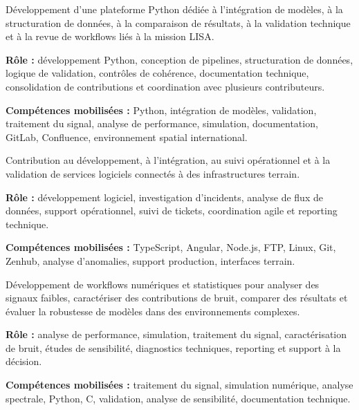 \documentclass[8pt,a4paper,ragged2e,withhyper]{altacv}
\begin{document}
Développement d’une plateforme Python dédiée à l’intégration de modèles, à la structuration de données, à la comparaison de résultats, à la validation technique et à la revue de workflows liés à la mission LISA.

\textbf{Rôle :} développement Python, conception de pipelines, structuration de données, logique de validation, contrôles de cohérence, documentation technique, consolidation de contributions et coordination avec plusieurs contributeurs.

\textbf{Compétences mobilisées :} Python, intégration de modèles, validation, traitement du signal, analyse de performance, simulation, documentation, GitLab, Confluence, environnement spatial international.

\divider


Contribution au développement, à l’intégration, au suivi opérationnel et à la validation de services logiciels connectés à des infrastructures terrain.

\textbf{Rôle :} développement logiciel, investigation d’incidents, analyse de flux de données, support opérationnel, suivi de tickets, coordination agile et reporting technique.

\textbf{Compétences mobilisées :} TypeScript, Angular, Node.js, FTP, Linux, Git, Zenhub, analyse d’anomalies, support production, interfaces terrain.

\divider


Développement de workflows numériques et statistiques pour analyser des signaux faibles, caractériser des contributions de bruit, comparer des résultats et évaluer la robustesse de modèles dans des environnements complexes.

\textbf{Rôle :} analyse de performance, simulation, traitement du signal, caractérisation de bruit, études de sensibilité, diagnostics techniques, reporting et support à la décision.

\textbf{Compétences mobilisées :} traitement du signal, simulation numérique, analyse spectrale, Python, C, validation, analyse de sensibilité, documentation technique.

\end{document}
